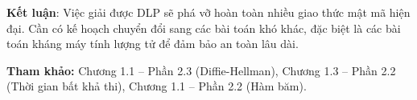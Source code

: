\textbf{Kết luận}: Việc giải được DLP sẽ phá vỡ hoàn toàn nhiều giao thức mật mã hiện đại. Cần có kế hoạch chuyển đổi sang các bài toán khó khác, đặc biệt là các bài toán kháng máy tính lượng tử để đảm bảo an toàn lâu dài.

\textbf{Tham khảo:} Chương 1.1 – Phần 2.3 (Diffie-Hellman), Chương 1.3 – Phần 2.2 (Thời gian bất khả thi), Chương 1.1 – Phần 2.2 (Hàm băm).
